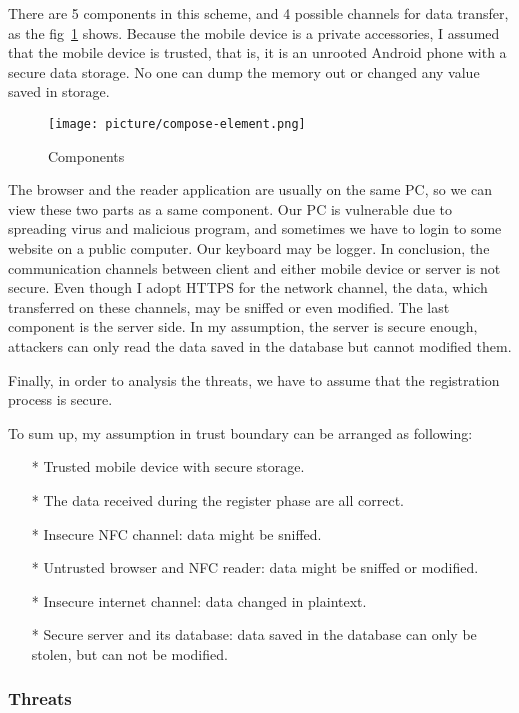 \begin{CJK}{Bg5}{bsmi}
There are 5 components in this scheme, and 4 possible channels for data transfer, as the fig~\ref{fig:compose-element} shows. Because the mobile device is a private accessories, I assumed that the mobile device is trusted, that is, it is an unrooted Android phone with a secure data storage. No one can dump the memory out or changed any value saved in storage. 

\begin{figure}
\centering
\texttt{[image: picture/compose-element.png]}
\caption{Components}
\label{fig:compose-element}
\end{figure}

The browser and the reader application are usually on the same PC, so we can view these two parts as a same component. Our PC is vulnerable due to spreading virus and malicious program, and sometimes we have to login to some website on a public computer. Our keyboard may be logger. In conclusion, the communication channels between client and either mobile device or server is not secure. Even though I adopt HTTPS for the network channel, the data, which transferred on these channels, may be sniffed or even modified. The last component is the server side. In my assumption, the server is secure enough, attackers can only read the data saved in the database but cannot modified them.

Finally, in order to analysis the threats, we have to assume that the registration process is secure.

To sum up, my assumption in trust boundary can be arranged as following:
\begin{enumerate}
\item[*] Trusted mobile device with secure storage.
\item[*] The data received during the register phase are all correct.
\item[*] Insecure NFC channel: data might be sniffed.
\item[*] Untrusted browser and NFC reader: data might be sniffed or modified.
\item[*] Insecure internet channel: data changed in plaintext.
\item[*] Secure server and its database: data saved in the database can only be stolen, but can not be modified.
\end{enumerate}

\subsubsection{Threats}


\end{CJK}
